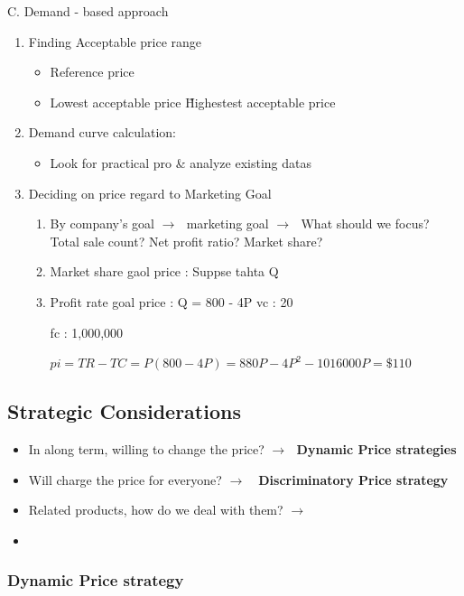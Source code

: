 \documentclass[12pt]{article}
\newcommand{\ra}{$\rightarrow \text{ }$}
\newcommand{\tb}{\textbf}
\begin{document}
\begin{itemize}
C. Demand - based approach
\begin{enumerate}
	\item Finding Acceptable price range
	\begin{itemize}
		\item Reference price
		\item Lowest acceptable price \~ Highestest acceptable price
	\end{itemize}
	\item Demand curve calculation:
	\begin{itemize}
		\item Look for practical pro \& analyze existing datas
	\end{itemize}
	\item Deciding on price regard to Marketing Goal
	\begin{enumerate}
		\item By company's goal \ra marketing goal \ra What should we focus? Total sale count? Net profit ratio? Market share?
		\item Market share gaol price :
		Suppse tahta Q

		\item Profit rate goal price :
		Q = 800 - 4P
		vc : 20

		fc : 1,000,000

		$ pi = TR - TC = P(800 - 4P) = 880P -4P^2 -1016000 \ra P = \$110 $
	\end{enumerate}
\end{enumerate}


\subsection{Strategic Considerations}

\begin{itemize}
	\item In  along term, willing to change the price? \ra \tb{Dynamic Price strategies}
	\item Will charge the price for everyone? \ra \tb{ Discriminatory Price strategy}
	\item Related products, how do we deal with them? \ra \tb{}
	\item
\end{itemize}

\subsubsection{Dynamic Price strategy}


\end{itemize}
\end{document}
